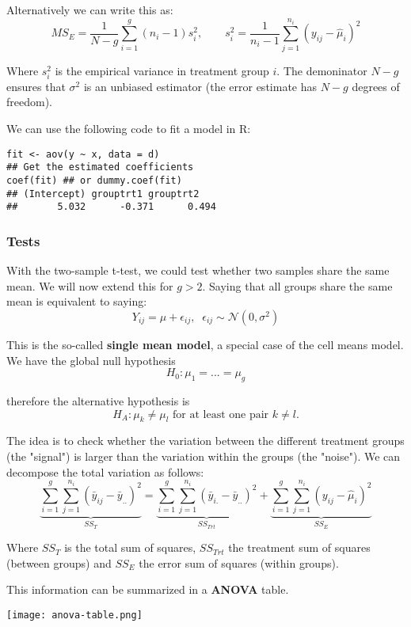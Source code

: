 Alternatively we can write this as:
$$MS_E = \frac{1}{N-g} \sum_{i=1}^g (n_i - 1) s_i^2, \qquad s_i^2 = \frac{1}{n_i -1} \sum_{j=1}^{n_i}(y_{ij} - \hat \mu_i)^2$$

Where $s_i^2$ is the empirical variance in treatment group $i$. The demoninator $N - g$ ensures that $\sigma^2$ is an unbiased estimator (the error estimate has $N-g$ degrees of freedom).\medskip

We can use the following code to fit a model in R:
\begin{lstlisting}
fit <- aov(y ~ x, data = d)
## Get the estimated coefficients
coef(fit) ## or dummy.coef(fit)
## (Intercept) grouptrt1 grouptrt2
##       5.032      -0.371      0.494
\end{lstlisting}

\subsubsection{Tests}

With the two-sample t-test, we could test whether two samples share the same mean. We will now extend this for $g > 2$. Saying that all groups share the same mean is equivalent to saying:
$$Y_{ij} = \mu + \epsilon_{ij}, \; \; \epsilon_{ij} \sim \mathcal N(0, \sigma^2)$$

This is the so-called \textbf{single mean model}, a special case of the cell means model. We have the global null hypothesis
$$H_0 : \mu_1 = ... = \mu_g$$

therefore the alternative hypothesis is
$$H_A : \mu_k \neq \mu_l \text{ for at least one pair } k \neq l.$$

The idea is to check whether the variation between the different treatment groups (the "signal") is  larger than the variation within the groups (the "noise"). We can decompose the total variation as follows:
$$\underbrace{\sum_{i=1}^g \sum_{j=1}^{n_i}(\bar y_{ij} - \bar y_{..})^2}_{SS_T} = \underbrace{\sum_{i=1}^g \sum_{j=1}^{n_i}(\bar y_{i.} - \bar y_{..})^2}_{SS_{Trt}} + \underbrace{\sum_{i=1}^g \sum_{j=1}^{n_i}(y_{ij} - \hat \mu_i)^2}_{SS_E} $$

Where $SS_T$ is the total sum of squares, $SS_{Trt}$ the treatment sum of squares (between groups) and $SS_E$ the error sum of squares (within groups).\medskip

This information can be summarized in a \textbf{ANOVA} table.
\begin{center}
	\texttt{[image: anova-table.png]}
\end{center}

